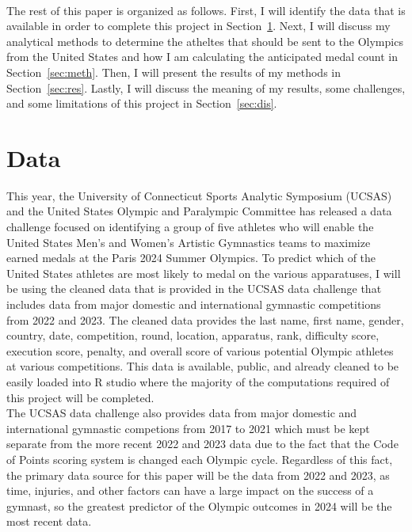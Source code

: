 \documentclass[12pt]{article}
\begin{document}
\\

The rest of this paper is organized as follows. First, I will identify the data that is available
 in order to complete this project in Section~\ref{sec:data}. Next, I will discuss my 
 analytical methods to determine the atheltes that should be sent to the Olympics from the United States and how 
 I am calculating the anticipated medal count in Section~\ref{sec:meth}. Then, I will present the results of my 
 methods in Section~\ref{sec:res}. Lastly, I will discuss the meaning of my results, some challenges, 
 and some limitations of this project in Section~\ref{sec:dis}.

\section{Data}
\label{sec:data}

This year, the University of Connecticut Sports Analytic Symposium (UCSAS) and the United States 
Olympic and Paralympic Committee has released a data challenge focused on identifying a group of 
five athletes who will enable the United States Men's and Women's Artistic Gymnastics teams to 
maximize earned medals at the Paris 2024 Summer Olympics. To predict which of the United States 
athletes are most likely to medal on the various apparatuses, I will be using the cleaned data that 
is provided in the UCSAS data challenge that includes data from major domestic and international 
gymnastic competitions from 2022 and 2023. The cleaned data provides the last name, first name, gender, 
country, date, competition, round, location, apparatus, rank, difficulty score, execution score, penalty, 
and overall score of various potential Olympic athletes at various competitions. This data is available, 
public, and already cleaned to be easily loaded into R studio where the majority of the computations 
required of this project will be completed. 
\\
The UCSAS data challenge also provides data from major domestic
and international gymnastic competions from 2017 to 2021 which must be kept separate from the more recent 2022 
and 2023 data due to the fact that the Code of Points scoring system is changed each Olympic cycle. Regardless 
of this fact, the primary data source for this paper will be the data from 2022 and 2023, as time, injuries, 
and other factors can have a large impact on the success of a gymnast, so the greatest predictor
of the Olympic outcomes in 2024 will be the most recent data.
\end{document}
